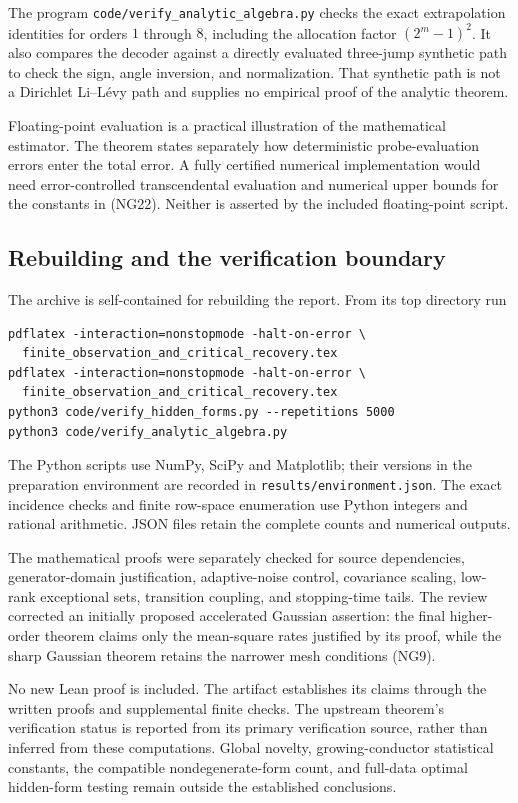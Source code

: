 The program \texttt{code/verify\_analytic\_algebra.py} checks the exact extrapolation identities for orders $1$ through $8$, including the allocation factor $(2^m-1)^2$. It also compares the decoder against a directly evaluated three-jump synthetic path to check the sign, angle inversion, and normalization. That synthetic path is not a Dirichlet Li--L\'evy path and supplies no empirical proof of the analytic theorem.

Floating-point evaluation is a practical illustration of the mathematical estimator. The theorem states separately how deterministic probe-evaluation errors enter the total error. A fully certified numerical implementation would need error-controlled transcendental evaluation and numerical upper bounds for the constants in (NG22). Neither is asserted by the included floating-point script.

\subsection{Rebuilding and the verification boundary}

The archive is self-contained for rebuilding the report. From its top directory run
\begin{verbatim}
pdflatex -interaction=nonstopmode -halt-on-error \
  finite_observation_and_critical_recovery.tex
pdflatex -interaction=nonstopmode -halt-on-error \
  finite_observation_and_critical_recovery.tex
python3 code/verify_hidden_forms.py --repetitions 5000
python3 code/verify_analytic_algebra.py
\end{verbatim}
The Python scripts use NumPy, SciPy and Matplotlib; their versions in the preparation environment are recorded in \texttt{results/environment.json}. The exact incidence checks and finite row-space enumeration use Python integers and rational arithmetic. JSON files retain the complete counts and numerical outputs.

The mathematical proofs were separately checked for source dependencies, generator-domain justification, adaptive-noise control, covariance scaling, low-rank exceptional sets, transition coupling, and stopping-time tails. The review corrected an initially proposed accelerated Gaussian assertion: the final higher-order theorem claims only the mean-square rates justified by its proof, while the sharp Gaussian theorem retains the narrower mesh conditions (NG9).

No new Lean proof is included. The artifact establishes its claims through the written proofs and supplemental finite checks. The upstream theorem's verification status is reported from its primary verification source, rather than inferred from these computations. Global novelty, growing-conductor statistical constants, the compatible nondegenerate-form count, and full-data optimal hidden-form testing remain outside the established conclusions.
